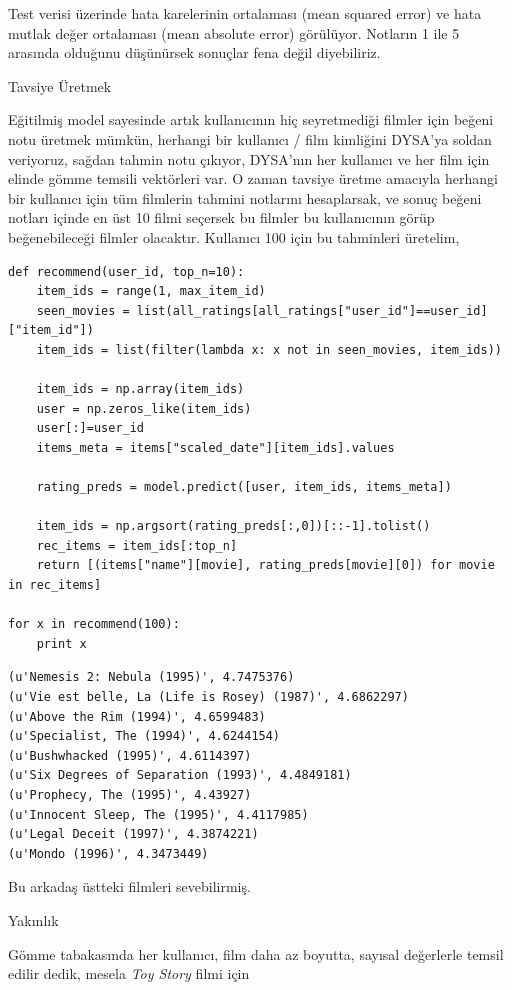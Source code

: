 \documentclass[12pt,fleqn]{article}\usepackage{../../common}
\begin{document}
Test verisi üzerinde hata karelerinin ortalaması (mean squared error) ve
hata mutlak değer ortalaması (mean absolute error) görülüyor. Notların 1
ile 5 arasında olduğunu düşünürsek sonuçlar fena değil diyebiliriz.

Tavsiye Üretmek

Eğitilmiş model sayesinde artık kullanıcının hiç seyretmediği filmler için
beğeni notu üretmek mümkün, herhangi bir kullanıcı / film kimliğini DYSA'ya
soldan veriyoruz, sağdan tahmin notu çıkıyor, DYSA'nın her kullanıcı ve her
film için elinde gömme temsili vektörleri var. O zaman tavsiye üretme
amacıyla herhangi bir kullanıcı için tüm filmlerin tahmini notlarını
hesaplarsak, ve sonuç beğeni notları içinde en üst 10 filmi seçersek bu
filmler bu kullanıcının görüp beğenebileceği filmler olacaktır. Kullanıcı
100 için bu tahminleri üretelim,

\begin{verbatim}
def recommend(user_id, top_n=10):
    item_ids = range(1, max_item_id)
    seen_movies = list(all_ratings[all_ratings["user_id"]==user_id]["item_id"])
    item_ids = list(filter(lambda x: x not in seen_movies, item_ids))
        
    item_ids = np.array(item_ids)
    user = np.zeros_like(item_ids)
    user[:]=user_id
    items_meta = items["scaled_date"][item_ids].values
    
    rating_preds = model.predict([user, item_ids, items_meta])
    
    item_ids = np.argsort(rating_preds[:,0])[::-1].tolist()
    rec_items = item_ids[:top_n]
    return [(items["name"][movie], rating_preds[movie][0]) for movie in rec_items]

for x in recommend(100): 
    print x
\end{verbatim}

\begin{verbatim}
(u'Nemesis 2: Nebula (1995)', 4.7475376)
(u'Vie est belle, La (Life is Rosey) (1987)', 4.6862297)
(u'Above the Rim (1994)', 4.6599483)
(u'Specialist, The (1994)', 4.6244154)
(u'Bushwhacked (1995)', 4.6114397)
(u'Six Degrees of Separation (1993)', 4.4849181)
(u'Prophecy, The (1995)', 4.43927)
(u'Innocent Sleep, The (1995)', 4.4117985)
(u'Legal Deceit (1997)', 4.3874221)
(u'Mondo (1996)', 4.3473449)
\end{verbatim}

Bu arkadaş üstteki filmleri sevebilirmiş. 

Yakınlık

Gömme tabakasında her kullanıcı, film daha az boyutta, sayısal değerlerle
temsil edilir dedik, mesela {\em Toy Story} filmi için 
\end{document}
